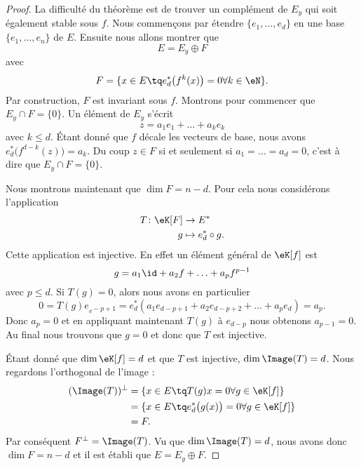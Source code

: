 \begin{proof}
    La difficulté du théorème est de trouver un complément de \( E_y\) qui soit également stable sous \( f\). Nous commençons par étendre \( \{ e_1,\ldots, e_d \}\) en une base \( \{ e_1,\ldots, e_n \}\) de \( E\). Ensuite nous allons montrer que
    \begin{equation}
        E=E_y\oplus F
    \end{equation}
    avec
    \begin{equation}
        F=\{ x\in E\tq  e^*_d\big( f^k(x) \big)=0\forall k\in \eN \}.
    \end{equation}
    Par construction, \( F\) est invariant sous \( f\). Montrons pour commencer que \( E_y\cap F=\{ 0 \}\). Un élément de \( E_y\) s'écrit
    \begin{equation}
        z=a_1e_1+\ldots +a_ke_k
    \end{equation}
    avec \( k\leq d\). Étant donné que \( f\) décale les vecteurs de base, nous avons \( e^*_d\big( f^{d-k}(z) \big)=a_k\). Du coup \( z\in F\) si et seulement si \( a_1=\ldots=a_d=0\), c'est à dire que \( E_y\cap F=\{ 0 \}\).

    Nous montrons maintenant que \( \dim F=n-d\). Pour cela nous considérons l'application
    \begin{equation}
        \begin{aligned}
            T\colon \eK[F]&\to E^* \\
            g&\mapsto e^*_d\circ g. 
        \end{aligned}
    \end{equation}
    Cette application est injective. En effet un élément général de \( \eK[f]\) est
    \begin{equation}
        g=a_1\id+a_2f+\ldots +a_pf^{p-1}
    \end{equation}
    avec \( p\leq d\). Si \( T(g)=0\), alors nous avons en particulier
    \begin{equation}
        0=T(g)e_{_d-p+1}=e^*_d(a_1e_{d-p+1}+a_2e_{d-p+2}+\ldots +a_pe_d)=a_p.
    \end{equation}
    Donc \( a_p=0\) et en appliquant maintenant \( T(g)\) à \( e_{d-p}\) nous obtenons \( a_{p-1}=0\). Au final nous trouvons que \( g=0\) et donc que \( T\) est injective.

    Étant donné que \( \dim\eK[f]=d\) et que \( T\) est injective, \( \dim\Image(T)=d\). Nous regardons l'orthogonal de l'image :
    \begin{subequations}
        \begin{align}
            (\Image(T))^{\perp}&=\{ x\in E\tq T(g)x=0\forall g\in\eK[f] \}\\
            &=\{ x\in E\tq e^*_d\big( g(x) \big)=0\forall g\in \eK[f] \}\\
            &=F.
        \end{align}
    \end{subequations}
    Par conséquent \( F^{\perp}=\Image(T)\). Vu que \( \dim\Image(T)=d\), nous avons donc \( \dim F=n-d\) et il est établi que \( E=E_y\oplus F\). 


\end{proof}
